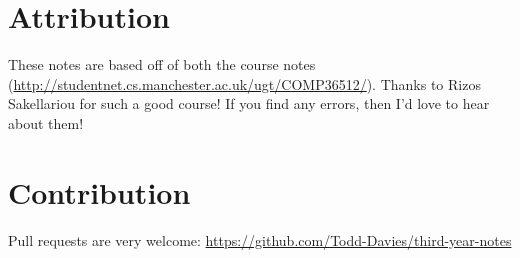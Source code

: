 \section*{Attribution}

These notes are based off of both the course notes
(\url{http://studentnet.cs.manchester.ac.uk/ugt/COMP36512/}). Thanks to Rizos Sakellariou for such a good course! If you find any errors, then I'd love to hear about them!

\section*{Contribution}

Pull requests are very welcome:
\url{https://github.com/Todd-Davies/third-year-notes}
